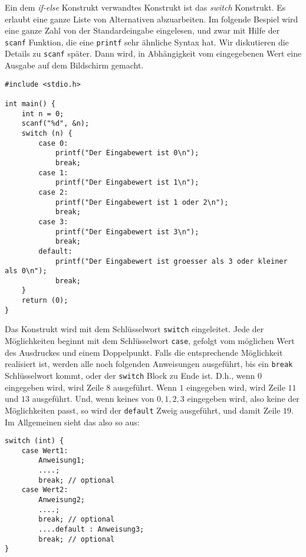 Ein dem \emph{if-else} Konstrukt verwandtes Konstrukt ist das \emph{switch} Konstrukt.
Es erlaubt eine ganze Liste von Alternativen abzuarbeiten.
Im folgende Bespiel wird eine ganze Zahl von der Standardeingabe eingelesen, und zwar mit Hilfe der \verb|scanf| Funktion, die eine \verb|printf| sehr ähnliche Syntax hat.
Wir diskutieren die Details zu \verb|scanf| später.
Dann wird, in Abhängigkeit vom eingegebenen Wert eine Ausgabe auf dem Bildschirm gemacht.
\begin{lstlisting}
#include <stdio.h>

int main() {
    int n = 0;
    scanf("%d", &n);
    switch (n) {
        case 0:
            printf("Der Eingabewert ist 0\n");
            break;
        case 1:
            printf("Der Eingabewert ist 1\n");
        case 2:
            printf("Der Eingabewert ist 1 oder 2\n");
            break;
        case 3:
            printf("Der Eingabewert ist 3\n");
            break;
        default:
            printf("Der Eingabewert ist groesser als 3 oder kleiner als 0\n");
            break;
    }
    return (0);
}
\end{lstlisting}
Das Konstrukt wird mit dem Schlüsselwort \verb|switch| eingeleitet.
Jede der Möglichkeiten beginnt mit dem Schlüsselwort \verb|case|, gefolgt vom möglichen Wert des Ausdruckes und einem Doppelpunkt. 
Falls die entsprechende Möglichkeit realisiert ist, werden alle noch folgenden Anweisungen ausgeführt, bis ein \verb|break| Schlüsselwort kommt, oder der \verb|switch| Block zu Ende ist.
D.h., wenn $0$ eingegeben wird, wird Zeile $8$ ausgeführt.
Wenn $1$ eingegeben wird, wird Zeile $11$ und $13$ ausgeführt.
Und, wenn keines von $0,1,2,3$ eingegeben wird, also keine der Möglichkeiten passt, so wird der \verb|default| Zweig ausgeführt, und damit Zeile $19$.
Im Allgemeinen sieht das also so aus:
\begin{lstlisting}
switch (int) {
    case Wert1:
        Anweisung1;
        ....;
        break; // optional
    case Wert2:
        Anweisung2;
        ....;
        break; // optional
        ....default : Anweisung3;
        break; // optional
}
\end{lstlisting}

